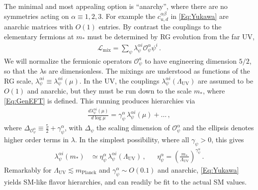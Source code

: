 \documentclass[aps,prl,twocolumn,showpacs,10pt,preprintnumbers,nofootinbib]{revtex4-2}
\newcommand{\mst}{m_*}
\newcommand{\LUV}{\Lambda_{\text{UV}}}
\newcommand{\op}{\mathcal{O}}
\begin{document}
The minimal and most appealing option is ``anarchy'', where there are no symmetries acting on $\alpha\equiv1,2,3$. For example the $c^{\alpha \beta}_{u,d}$ in \eqref{Eq:Yukawa} are anarchic matrices with $O(1)$ entries. By contrast the couplings to the elementary fermions at $\mst$ must be determined by RG evolution from the far UV, 
\begin{align}\label{Eq:MixingsUV}
    \mathcal{L}_{\text{mix}} = \sum_{\psi}\lambda_{\psi}^{\alpha i}\op_{\psi}^\alpha\psi^i\,.
\end{align}
We will normalize the fermionic operators $\op_{\psi}^a$ to have engineering dimension $5/2$, so that the $\lambda$s are dimensionless. The mixings are understood as functions of the RG scale, $\lambda_{\psi}^{\alpha i} \equiv \lambda_{\psi}^{\alpha i}(\mu)$. In the UV, the couplings $\lambda_{\psi}^{\alpha i}(\Lambda_{\text{UV}})$ are assumed to be $O(1)$ and anarchic, but they must be run down to the scale $\mst$, where \eqref{Eq:GenEFT} is defined. This running produces hierarchies via
\begin{align}
\frac{d \lambda^{\alpha i}_{\psi} (\mu)}{d \log \mu} = \gamma^{\alpha}_{\psi}\,\lambda^{\alpha i}_{\psi}(\mu)+\ldots \,,
\end{align}
where $\Delta_{\mathcal{O}_{\psi}^{\alpha}} \equiv \frac{5}{2} + \gamma_{\psi}^{\alpha}$, with $\Delta_{\psi}$ the scaling dimension of $\mathcal{O}_{\psi}^{\alpha}$ and the ellipsis denotes higher order terms in $\lambda$. In the simplest possibility, where all $\gamma_{\psi} >0$, this gives
\begin{align}\label{Eq:AnarcRG}
    \lambda^{\alpha i}_{\psi} (\mst)&\simeq \eta_{\psi}^{\alpha}\,\lambda_{\psi}^{\alpha i}(\LUV)   
    \,, 
    && \eta_{\psi}^{\alpha}=\left(\frac{m_*}{\LUV} \right)^{\gamma_{\psi}^{\alpha}}\,.
\end{align}
Remarkably for $\Lambda_{\text{UV}}\lesssim m_{\text{Planck}}$ and $\gamma_{\psi}^{\alpha} \sim O(0.1)$ and anarchic, \eqref{Eq:Yukawa} yields SM-like flavor hierarchies, and can readily be fit to the actual SM values. 
\end{document}
